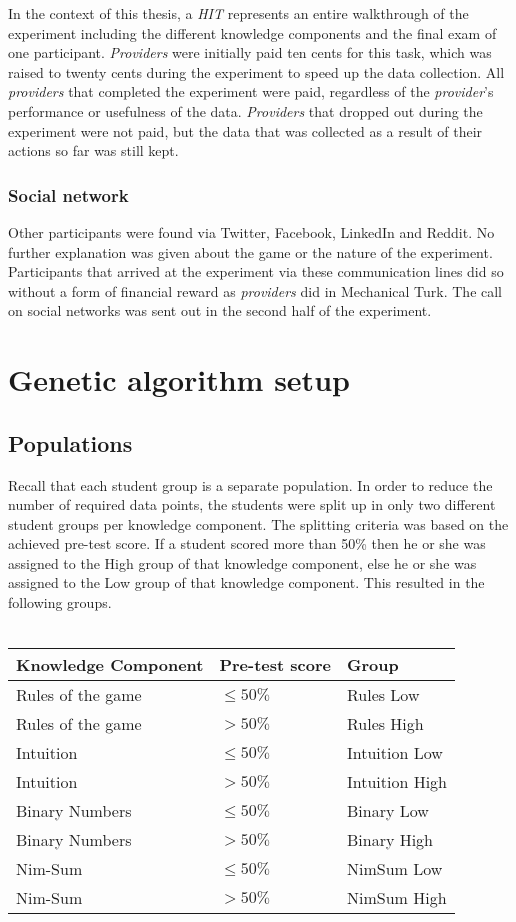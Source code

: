 In the context of this thesis, a \emph{HIT} represents an entire walkthrough of
the experiment including the different knowledge components and the final exam
of one participant. \emph{Providers} were initially paid ten cents for this task,
which was raised to twenty cents during the experiment to speed up the data
collection. All \emph{providers} that completed the experiment were paid,
regardless of the \emph{provider}'s performance or usefulness of the data.
\emph{Providers} that dropped out during the experiment were not paid, but the data
that was collected as a result of their actions so far was still kept.
\subsubsection{Social network}
Other participants were found via Twitter, Facebook, LinkedIn and Reddit. No
further explanation was given about the game or the nature of the experiment.
Participants that arrived at the experiment via these communication lines did
so without a form of financial reward as \emph{providers} did in Mechanical
Turk. The call on social networks was sent out in the second half of the
experiment.

\section{Genetic algorithm setup}
\subsection{Populations}
\label{sec:setup_groups}
Recall that each student group is a separate population. 
In order to reduce the
number of required data points, the students were split up in only two
different student groups per knowledge component. The splitting criteria was
based on the achieved pre-test score. If a student scored more than 50\% then
he or she was assigned to the High group of that knowledge component, else he
or she was assigned to the Low group of that knowledge component. This resulted
in the following groups.\\\\
\begin{tabular}{lll}\hline
	\textbf{Knowledge Component} & \textbf{Pre-test score}    & \textbf{Group} \\\hline
	Rules of the game	& $\leq 50\%$		& Rules Low \\
	Rules of the game	& $> 50\%$			& Rules High \\
	Intuition			& $\leq 50\%$		& Intuition Low \\
	Intuition			& $> 50\%$			& Intuition High \\
	Binary Numbers		& $\leq 50\%$		& Binary Low \\
	Binary Numbers		& $> 50\%$			& Binary High \\
	Nim-Sum				& $\leq 50\%$		& NimSum Low \\
	Nim-Sum				& $> 50\%$			& NimSum High \\
\end{tabular}
